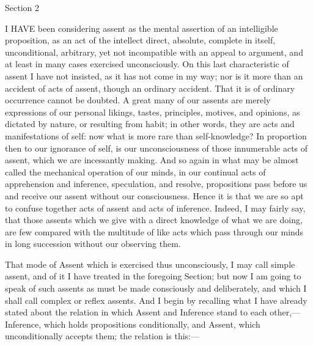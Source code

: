 Section 2


I HAVE been considering assent as the mental assertion of an
intelligible proposition, as an act of the intellect direct, absolute,
complete in itself, unconditional, arbitrary, yet not incompatible
with an appeal to argument, and at least in many cases exercised
unconsciously. On this last characteristic of assent I have not
insisted, as it has not come in my way; nor is it more than an
accident of acts of assent, though an ordinary accident. That it is of
ordinary occurrence cannot be doubted. A great many of our assents are
merely expressions of our personal likings, tastes, principles,
motives, and opinions, as dictated by nature, or resulting from habit;
in other words, they are acts and manifestations of self: now what is
more rare than self-knowledge? In proportion then to our ignorance of
self, is our unconsciousness of those innumerable acts of assent,
which we are incessantly making. And so again in what may be almost
called the mechanical operation of our minds, in our continual acts of
apprehension and inference, speculation, and resolve, propositions
pass before us and receive our assent without our consciousness. Hence
it is that we are so apt to confuse together acts of assent and acts
of inference. Indeed, I may fairly say, that those assents which
we give with a direct knowledge of what we are doing, are few compared
with the multitude of like acts which pass through our minds in long
succession without our observing them.

That mode of Assent which is exercised thus unconsciously, I may
call simple assent, and of it I have treated in the foregoing Section;
but now I am going to speak of such assents as must be made
consciously and deliberately, and which I shall call complex or reflex
assents. And I begin by recalling what I have already stated about the
relation in which Assent and Inference stand to each other,—Inference,
which holds propositions conditionally, and Assent, which
unconditionally accepts them; the relation is this:—

